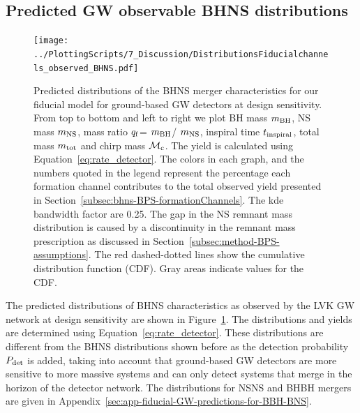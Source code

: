 \documentclass[twocolumn]{aastex63}
\newcommand\bhnsSingle{BHNS\xspace}
\newcommand{\tinspiral}{\ensuremath{{t}_{\rm{inspiral}}}\xspace}
\newcommand{\Pdet}{\ensuremath{{P}_{\rm{det}}}\xspace}
\newcommand{\mnsf}{\ensuremath{m_{\rm{NS}}}\xspace}
\newcommand{\mbhf}{\ensuremath{m_{\rm{BH}}}\xspace}
\newcommand{\mtotf}{\ensuremath{m_{\rm{tot}}}\xspace}
\newcommand{\mchirpf}{\ensuremath{{\mathcal{M}}_{\rm{c}}}\xspace}
\newcommand{\qf}{\ensuremath{q_{\rm{f}}}\xspace}
\begin{document}
\subsection{Predicted GW observable \bhnsSingle distributions }
\label{subsec:distributions-FIducial-GW-observable}
%




\begin{figure}
\texttt{[image: ../PlottingScripts/7\_Discussion/DistributionsFiducialchannels\_observed\_BHNS.pdf]}
   \caption{ Predicted distributions of the  \bhnsSingle merger characteristics for our fiducial model for ground-based \ac{GW} detectors at design sensitivity.  From top to bottom and left to right we plot  \ac{BH} mass \mbhf, \ac{NS} mass \mnsf, mass ratio \qf = \mbhf / \mnsf,  inspiral time \tinspiral, total mass \mtotf and chirp mass \mchirpf. The yield is calculated using Equation~\ref{eq:rate_detector}. The colors in each graph, and the numbers quoted in the legend represent the percentage each formation channel contributes to the total observed yield presented in Section~\ref{subsec:bhns-BPS-formationChannels}.  The kde bandwidth factor are 0.25.  The gap in the \ac{NS} remnant mass distribution is caused by a discontinuity in the remnant mass prescription as discussed in Section~\ref{subsec:method-BPS-assumptions}. The red dashed-dotted lines show the cumulative distribution function (CDF). Gray areas indicate values for the CDF. }
  \label{fig:BHNS_DCO_observed}
\end{figure}
%


The predicted distributions of \bhnsSingle characteristics as observed by the LVK \ac{GW} network at design sensitivity are shown in Figure~\ref{fig:BHNS_DCO_observed}. 
The distributions and yields are determined using Equation~\ref{eq:rate_detector}. These distributions are different from the \bhnsSingle distributions shown before as the detection probability \Pdet is added, taking into account that ground-based \ac{GW} detectors are  more sensitive to more massive systems and can only detect systems that merge in the horizon of the detector network.
The distributions for \ac{NSNS} and \ac{BHBH} mergers are given in Appendix~\ref{sec:app-fiducial-GW-predictions-for-BBH-BNS}. 
\end{document}
